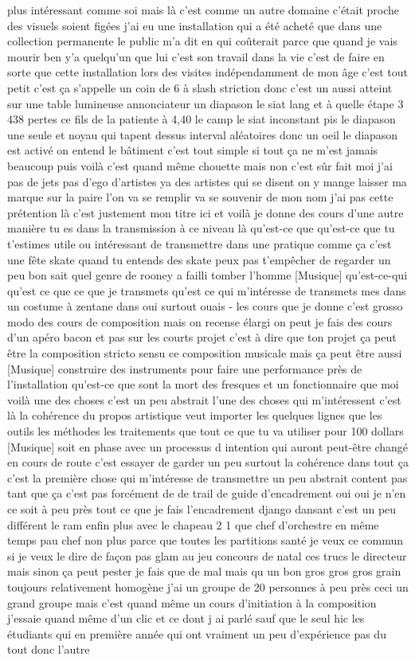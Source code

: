 plus intéressant comme soi mais là c'est comme un autre domaine c'était proche des visuels soient figées j'ai eu une installation qui a été acheté que dans une collection permanente le public m'a dit en qui coûterait parce que quand je vais mourir ben y'a quelqu'un que lui c'est son travail dans la vie c'est de faire en sorte que cette installation lors des visites indépendamment de mon âge c'est tout petit c'est ça s'appelle un coin de 6 à slash striction donc c'est un aussi atteint sur une table lumineuse annonciateur un diapason le siat lang et à quelle étape 3 438 pertes ce fils de la patiente à 4,40 le camp le siat inconstant pis le diapason une seule et noyau qui tapent dessus interval aléatoires donc un oeil le diapason est activé on entend le bâtiment c'est tout simple si tout ça ne m'est jamais beaucoup puis voilà c'est quand même chouette mais non c'est sûr fait moi j'ai pas de jets pas d'ego d'artistes ya des artistes qui se disent on y mange laisser ma marque sur la paire l'on va se remplir va se souvenir de mon nom j'ai pas cette prétention là c'est justement mon titre ici et voilà je donne des cours d'une autre manière tu es dans la transmission à ce niveau là qu'est-ce que qu'est-ce que tu t'estimes utile ou intéressant de transmettre dans une pratique comme ça c'est une fête skate quand tu entends des skate peux pas t'empêcher de regarder un peu bon sait quel genre de rooney a failli tomber l'homme [Musique] qu'est-ce-qui qu'est ce que ce que je transmets qu'est ce qui m'intéresse de transmets mes dans un costume à zentane dans oui surtout ouais - les cours que je donne c'est grosso modo des cours de composition mais on recense élargi on peut je fais des cours d'un apéro bacon et pas sur les courts projet c'est à dire que ton projet ça peut être la composition stricto sensu ce composition musicale mais ça peut être aussi [Musique] construire des instruments pour faire une performance près de l'installation qu'est-ce que sont la mort des fresques et un fonctionnaire que moi voilà une des choses c'est un peu abstrait l'une des choses qui m'intéressent c'est là la cohérence du propos artistique veut importer les quelques lignes que les outils les méthodes les traitements que tout ce que tu va utiliser pour 100 dollars [Musique] soit en phase avec un processus d intention qui auront peut-être changé en cours de route c'est essayer de garder un peu surtout la cohérence dans tout ça c'est la première chose qui m'intéresse de transmettre un peu abstrait content pas tant que ça c'est pas forcément de de trail de guide d'encadrement oui oui je n'en ce soit à peu près tout ce que je fais l'encadrement django dansant c'est un peu différent le ram enfin plus avec le chapeau 2 1 que chef d'orchestre en même temps pau chef non plus parce que toutes les partitions santé je veux ce commun si je veux le dire de façon pas glam au jeu concours de natal ces trucs le directeur mais sinon ça peut pester je fais que de mal mais qu un bon gros gros gros grain toujours relativement homogène j'ai un groupe de 20 personnes à peu près ceci un grand groupe mais c'est quand même un cours d'initiation à la composition j'essaie quand même d'un clic et ce dont j ai parlé sauf que le seul hic les étudiants qui en première année qui ont vraiment un peu d'expérience pas du tout donc l'autre 